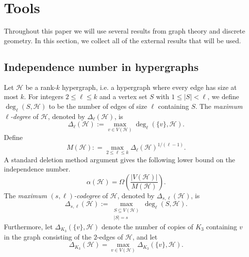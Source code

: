 \documentclass[11pt,oneside]{amsart}
\numberwithin{exercise}{subsection}
\begin{document}
\section{Tools}
\label{sec:tools}

Throughout this paper we will use several results from graph theory and discrete geometry. In this section, we collect all of the external results that will be used.

\subsection{Independence number in hypergraphs}

Let \( \mathcal{H} \) be a rank-\( k \) hypergraph, i.e. a hypergraph where every edge has size at most $k$. For integers \( 2 \leq \ell \leq k \) and a vertex set 
\( S \) with \( 1 \leq |S| < \ell \), we define \( \deg_\ell(S,\mathcal{H}) \) to be the number of edges 
of size \( \ell \) containing \( S \).
The \emph{maximum \( \ell \)-degree} of \( \mathcal{H} \), denoted by \( \Delta_\ell(\mathcal{H}) \), is
\[
\Delta_\ell(\mathcal{H}):= \max_{v \in V(\mathcal{H})} \deg_\ell(\{v\}, \mathcal{H}).
\]
Define
\[
M(\mathcal{H}):
=
\max_{2 \leq \ell \leq k}
\Delta_\ell(\mathcal{H})^{1/(\ell - 1)}.
\]
A standard deletion method argument gives the following lower bound on the independence number. 
\begin{equation*}
\alpha(\mathcal{H})
=
\Omega\!\left(
\frac{|V(\mathcal{H})|}{M(\mathcal{H})}
\right).
\end{equation*}
The \emph{maximum \( (s,\ell) \)-codegree} of \( \mathcal{H} \), denoted by \( \Delta_{s,\ell}(\mathcal{H}) \), is
\[
\Delta_{s,\ell}(\mathcal{H}) := 
\max_{\substack{S \subseteq V(\mathcal{H}) \\ |S| = s}} 
\deg_\ell(S, \mathcal{H}).
\]
Furthermore, let $\Delta_{K_3}(\{v\},\mathcal{H})$ denote the number of copies of
$K_3$ containing $v$ in the graph consisting of the $2$-edges of \(\mathcal H\), and let 
$$\Delta_{K_3}(\mathcal{H}) =\max_{v\in V(\mathcal{H})}\Delta_{K_3}(\{v\},\mathcal{H}).$$
\end{document}
